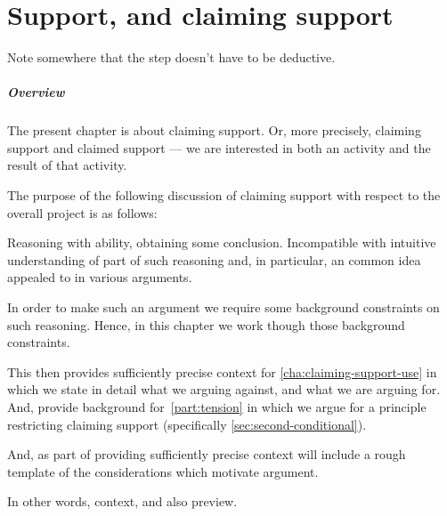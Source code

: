  \chapter{Support, and claiming support}
\label{cha:claiming-support}

\begin{note}
  \color{red}
  Note somewhere that the step doesn't have to be deductive.
\end{note}

\paragraph*{Overview}

\begin{note}
  The present chapter is about claiming support.
  Or, more precisely, claiming support and claimed support --- we are interested in both an activity and the result of that activity.

  The purpose of the following discussion of claiming support with respect to the {\color{red} overall project} is as follows:

  Reasoning with ability, obtaining some conclusion.
  Incompatible with intuitive understanding of part of such reasoning and, in particular, an common idea appealed to in various arguments.

  In order to make such an argument we require some background constraints on such reasoning.
  Hence, in this chapter we work though those background constraints.

  This then provides sufficiently precise context for \autoref{cha:claiming-support-use} in which we state in detail what we arguing against, and what we are arguing for.
  And, provide background for~\autoref{part:tension} in which we argue for a principle restricting claiming support (specifically \autoref{sec:second-conditional}).

  And, as part of providing sufficiently precise context will include a rough template of the considerations which motivate argument.

  In other words, context, and also preview.
\end{note}

